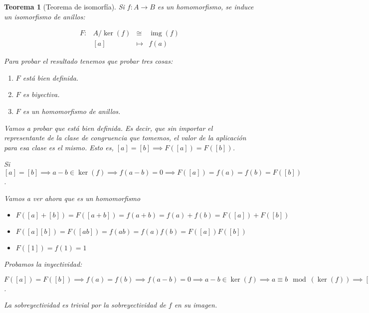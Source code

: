 \documentclass[11pt, a4paper, titlepage]{article}
\makeatletter
\newif\IfInSansMode
\let\oldsf\sffamily
\renewcommand*{\sffamily}{\oldsf\mathversion{sans}\InSansModetrue}
\let\oldnorm\normalfont
\renewcommand*{\normalfont}{\oldnorm\InSansModefalse\mathversion{normal}}
\renewenvironment{proof}[1][\proofname] {\vspace{-15pt}\par\pushQED{\qed}\normalfont\topsep6\p@\@plus6\p@\relax\trivlist\item[\hskip\labelsep\it#1\@addpunct{.}]\ignorespaces}{\popQED\endtrivlist\@endpefalse}
\DeclareMathOperator*{\img}{img}
\renewenvironment{proof}[1][\proofname] {\par\pushQED{\qed}\normalfont\topsep6\p@\@plus6\p@\relax\trivlist\item[\hskip\labelsep\itshape\sffamily#1\@addpunct{.}]\ignorespaces}{\popQED\endtrivlist\@endpefalse}
\theoremstyle{theorem-style}
\newtheorem{nth}{Teorema}[section]
\theoremstyle{definition-style}
\theoremstyle{remark-style}
\theoremstyle{example-style}
\newenvironment{nlist}
{\begin{enumerate}
\renewcommand\labelenumi{(\emph{\roman{enumi})}}}
{\end{enumerate}}
\makeatother
\begin{document}
\begin{nth}[Teorema de isomorfía]
  Si $f:A \to B$ es un homomorfismo, se induce un isomorfismo de anillos:

  \[
  \begin{array}{lrll}
    F: &  A/\ker(f) & \cong & \img(f) \\
       & [a] & \mapsto & f(a)
  \end{array}
  \]


\begin{proof}
  Para probar el resultado tenemos que probar tres cosas:

  \begin{nlist}
  \item $F$ está bien definida.
  \item $F$ es biyectiva.
  \item $F$ es un homomorfismo de anillos.
  \end{nlist}

  Vamos a probar que está bien definida. Es decir, que sin importar el representante de la clase de congruencia que tomemos,
  el valor de la aplicación para esa clase es el mismo. Esto es, $[a] = [b] \implies F([a]) = F([b])$.

  Si $[a] = [b] \implies a-b \in \ker(f) \implies f(a-b) = 0 \implies F([a]) = f(a) = f(b) = F([b])$.

  Vamos a ver ahora que es un homomorfismo
  \begin{itemize}
		\item $F([a]+[b]) = F([a+b]) = f(a+b) = f(a)+f(b) = F([a]) + F([b])$
		\item $F([a][b]) = F([ab]) = f(ab) = f(a)f(b) = F([a])F([b])$
		\item $F([1]) = f(1) = 1$
  \end{itemize}

Probamos la inyectividad:

$F([a]) = F([b]) \implies f(a) = f(b) \implies f(a-b) = 0 \implies a-b \in \ker(f) \implies a \equiv b\mod(\ker(f)) \implies [a] = [b]$.

La sobreyectividad es trivial por la sobreyectividad de $f$ en su imagen.

\end{proof}

\end{nth}
\end{document}
